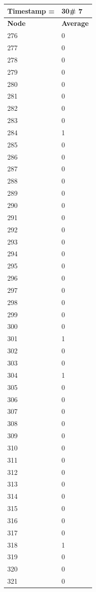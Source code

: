 \begin{tabular}{|l||l|}
\hline
\textbf{Timestamp =} & \textbf{30}\# 7\\\hline
	\textbf{Node} & \textbf{Average} \\ \hline
\hline
	276 & 0 \\ \hline
	277 & 0 \\ \hline
	278 & 0 \\ \hline
	279 & 0 \\ \hline
	280 & 0 \\ \hline
	281 & 0 \\ \hline
	282 & 0 \\ \hline
	283 & 0 \\ \hline
	284 & 1 \\ \hline
	285 & 0 \\ \hline
	286 & 0 \\ \hline
	287 & 0 \\ \hline
	288 & 0 \\ \hline
	289 & 0 \\ \hline
	290 & 0 \\ \hline
	291 & 0 \\ \hline
	292 & 0 \\ \hline
	293 & 0 \\ \hline
	294 & 0 \\ \hline
	295 & 0 \\ \hline
	296 & 0 \\ \hline
	297 & 0 \\ \hline
	298 & 0 \\ \hline
	299 & 0 \\ \hline
	300 & 0 \\ \hline
	301 & 1 \\ \hline
	302 & 0 \\ \hline
	303 & 0 \\ \hline
	304 & 1 \\ \hline
	305 & 0 \\ \hline
	306 & 0 \\ \hline
	307 & 0 \\ \hline
	308 & 0 \\ \hline
	309 & 0 \\ \hline
	310 & 0 \\ \hline
	311 & 0 \\ \hline
	312 & 0 \\ \hline
	313 & 0 \\ \hline
	314 & 0 \\ \hline
	315 & 0 \\ \hline
	316 & 0 \\ \hline
	317 & 0 \\ \hline
	318 & 1 \\ \hline
	319 & 0 \\ \hline
	320 & 0 \\ \hline
	321 & 0 \\ \hline
\end{tabular}
